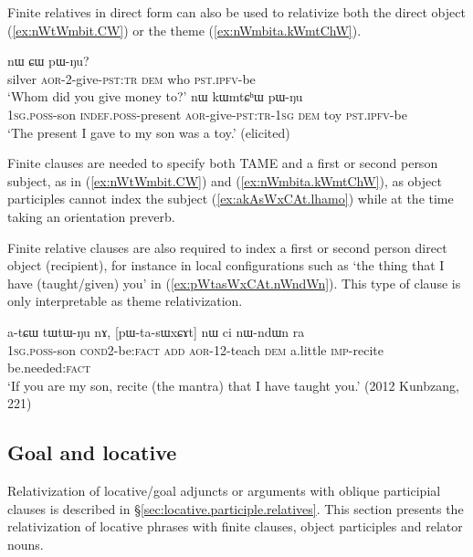Finite relatives in direct form can also be used to relativize both the direct object (\ref{ex:nWtWmbit.CW}) or the theme (\ref{ex:nWmbita.kWmtChW}). 

\begin{exe}
\ex 
\begin{xlist}
\ex \label{ex:nWtWmbit.CW}
 nɯ ɕɯ pɯ-ŋu? \\
silver \textsc{aor}-2-give-\textsc{pst}:\textsc{tr} \textsc{dem} who \textsc{pst}.\textsc{ipfv}-be \\
\glt `Whom did you give money to?'
\ex \label{ex:nWmbita.kWmtChW}
 nɯ kɯmtɕʰɯ pɯ-ŋu \\
 \textsc{1sg}.\textsc{poss}-son \textsc{indef}.\textsc{poss}-present \textsc{aor}-give-\textsc{pst}:\textsc{tr}-\textsc{1sg} \textsc{dem} toy \textsc{pst}.\textsc{ipfv}-be \\
 \glt `The present I gave to my son was a toy.' (elicited)
 \end{xlist} 
\end{exe} 

Finite clauses are needed to specify both TAME and a first or second person subject, as in (\ref{ex:nWtWmbit.CW}) and (\ref{ex:nWmbita.kWmtChW}), as object participles cannot index the subject (\ref{ex:akAsWxCAt.lhamo}) while at the time taking an orientation preverb.

Finite relative clauses are also required to index a first or second person direct object (recipient), for instance in local configurations such as  `the thing that I have (taught/given) you' in (\ref{ex:pWtasWxCAt.nWndWn}). This type of clause is only interpretable as theme relativization. 

\begin{exe}
\ex \label{ex:pWtasWxCAt.nWndWn}
\gll  a-tɕɯ tɯ\redp{}tɯ-ŋu nɤ, [pɯ-ta-sɯxɕɤt] nɯ ci nɯ-ndɯn ra \\
\textsc{1sg}.\textsc{poss}-son \textsc{cond}\redp{}2-be:\textsc{fact} \textsc{add} \textsc{aor}-1\fl{}2-teach \textsc{dem} a.little \textsc{imp}-recite be.needed:\textsc{fact} \\
\glt `If you are my son, recite (the mantra) that I have taught you.' (2012 Kunbzang, 221)
\end{exe} 


\subsection{Goal and locative} \label{sec:locative.relativization}
Relativization of locative/goal adjuncts or arguments with oblique participial clauses  is described in  §\ref{sec:locative.participle.relatives}. This section presents the relativization of locative phrases with finite clauses, object participles and relator nouns.
 

